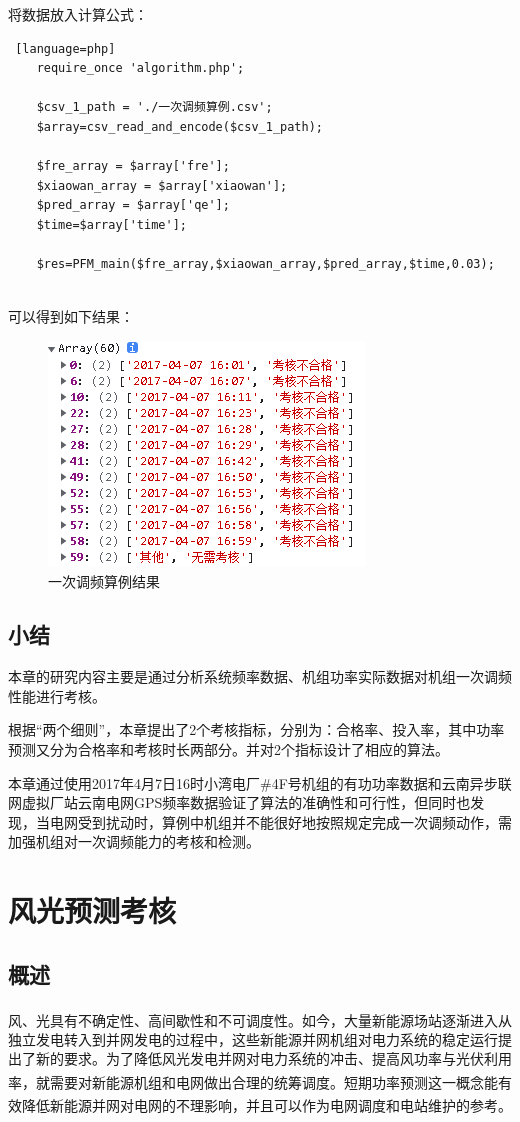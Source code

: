 \documentclass[winfonts,UTF8,a4paper]{ctexart}
\newcommand{\upcite}[1]{{\textsuperscript{\cite{#1}}}}
\begin{document}
将数据放入计算公式：
\begin{lstlisting} [language=php]
	require_once 'algorithm.php';
	
	$csv_1_path = './一次调频算例.csv';
	$array=csv_read_and_encode($csv_1_path);
	
	$fre_array = $array['fre'];
	$xiaowan_array = $array['xiaowan'];
	$pred_array = $array['qe'];
	$time=$array['time'];
	
	$res=PFM_main($fre_array,$xiaowan_array,$pred_array,$time,0.03);
	
\end{lstlisting}

可以得到如下结果：
\begin{figure}[H]
	\centering
	\includegraphics[width=0.5\linewidth]{pic/screenshot024}
	\caption{一次调频算例结果}
	\label{fig:screenshot024}
\end{figure}

\subsection{小结}
本章的研究内容主要是通过分析系统频率数据、机组功率实际数据对机组一次调频性能进行考核。

根据“两个细则”，本章提出了2个考核指标，分别为：合格率、投入率，其中功率预测又分为合格率和考核时长两部分。并对2个指标设计了相应的算法。

本章通过使用2017年4月7日16时小湾电厂\#4F号机组的有功功率数据和云南异步联网虚拟厂站云南电网GPS频率数据验证了算法的准确性和可行性，但同时也发现，当电网受到扰动时，算例中机组并不能很好地按照规定完成一次调频动作，需加强机组对一次调频能力的考核和检测。


\section{风光预测考核}

\subsection{概述}
风、光具有不确定性、高间歇性和不可调度性\upcite{刘云2019基于双参数最小二乘支持向量机}。如今，大量新能源场站逐渐进入从独立发电转入到并网发电的过程中，这些新能源并网机组对电力系统的稳定运行提出了新的要求。为了降低风光发电并网对电力系统的冲击、提高风功率与光伏利用率，就需要对新能源机组和电网做出合理的统筹调度\upcite{孙成胜2020一种改进的灰色}。短期功率预测这一概念能有效降低新能源并网对电网的不理影响\upcite{kumpf2017visualizing,王昕2016基于}，并且可以作为电网调度和电站维护的参考\upcite{黎静华2017基于,王要强2016光伏发电系统输出功率特性分析及其平滑控制研究,王守相2012基于灰色神经网络组合模型的光伏短期出力预测,毕锐2016基于模糊}。
\end{document}
